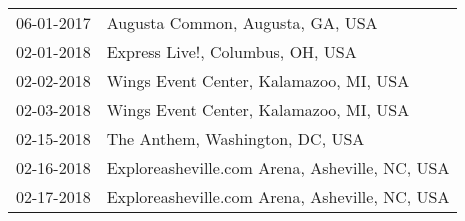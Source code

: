 \begin{supertabular}{ll}
 06-01-2017 &                Augusta Common, Augusta, GA, USA \\
 02-01-2018 &                Express Live!, Columbus, OH, USA \\
 02-02-2018 &          Wings Event Center, Kalamazoo, MI, USA \\
 02-03-2018 &          Wings Event Center, Kalamazoo, MI, USA \\
 02-15-2018 &                 The Anthem, Washington, DC, USA \\
 02-16-2018 &  Exploreasheville.com Arena, Asheville, NC, USA \\
 02-17-2018 &  Exploreasheville.com Arena, Asheville, NC, USA \\
\end{supertabular}

